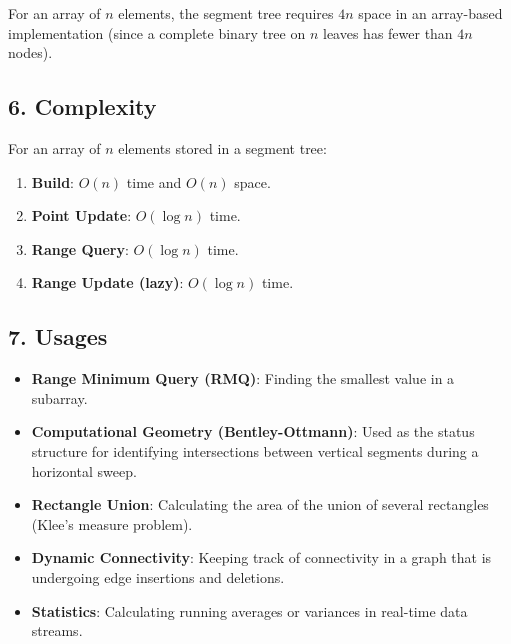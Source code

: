 \begin{definition}
\label{def:st_size}
For an array of $n$ elements, the segment tree requires $4n$ space in an array-based implementation (since a complete binary tree on $n$ leaves has fewer than $4n$ nodes).
\end{definition}

\subsection{6. Complexity}
\begin{theorem}
\label{thm:st_complexity}
For an array of $n$ elements stored in a segment tree:
\begin{enumerate}
    \item \textbf{Build}: $O(n)$ time and $O(n)$ space.
    \item \textbf{Point Update}: $O(\log n)$ time.
    \item \textbf{Range Query}: $O(\log n)$ time.
    \item \textbf{Range Update (lazy)}: $O(\log n)$ time.
\end{enumerate}
\end{theorem}

\subsection{7. Usages}
\begin{itemize}
    \item \textbf{Range Minimum Query (RMQ)}: Finding the smallest value in a subarray.
    \item \textbf{Computational Geometry (Bentley-Ottmann)}: Used as the status structure for identifying intersections between vertical segments during a horizontal sweep.
    \item \textbf{Rectangle Union}: Calculating the area of the union of several rectangles (Klee's measure problem).
    \item \textbf{Dynamic Connectivity}: Keeping track of connectivity in a graph that is undergoing edge insertions and deletions.
    \item \textbf{Statistics}: Calculating running averages or variances in real-time data streams.
\end{itemize}

